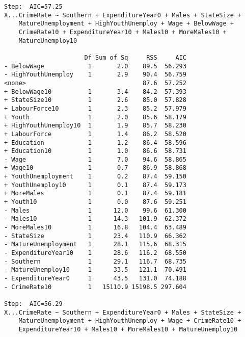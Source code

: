 \documentclass[11pt]{article}
\begin{document}
\begin{enumerate}
\begin{verbatim}
Step:  AIC=57.25
X...CrimeRate ~ Southern + ExpenditureYear0 + Males + StateSize + 
    MatureUnemployment + HighYouthUnemploy + Wage + BelowWage + 
    CrimeRate10 + ExpenditureYear10 + Males10 + MoreMales10 + 
    MatureUnemploy10

                      Df Sum of Sq     RSS     AIC
- BelowWage            1       2.0    89.5  56.293
- HighYouthUnemploy    1       2.9    90.4  56.759
<none>                                87.6  57.252
+ BelowWage10          1       3.4    84.2  57.393
+ StateSize10          1       2.6    85.0  57.828
+ LabourForce10        1       2.3    85.2  57.979
+ Youth                1       2.0    85.6  58.179
+ HighYouthUnemploy10  1       1.9    85.7  58.230
+ LabourForce          1       1.4    86.2  58.520
+ Education            1       1.2    86.4  58.596
+ Education10          1       1.0    86.6  58.731
- Wage                 1       7.0    94.6  58.865
+ Wage10               1       0.7    86.9  58.868
+ YouthUnemployment    1       0.2    87.4  59.150
+ YouthUnemploy10      1       0.1    87.4  59.173
+ MoreMales            1       0.1    87.4  59.181
+ Youth10              1       0.0    87.6  59.251
- Males                1      12.0    99.6  61.300
- Males10              1      14.3   101.9  62.372
- MoreMales10          1      16.8   104.4  63.489
- StateSize            1      23.4   110.9  66.362
- MatureUnemployment   1      28.1   115.6  68.315
- ExpenditureYear10    1      28.6   116.2  68.550
- Southern             1      29.1   116.7  68.735
- MatureUnemploy10     1      33.5   121.1  70.491
- ExpenditureYear0     1      43.5   131.0  74.188
- CrimeRate10          1   15110.9 15198.5 297.604

Step:  AIC=56.29
X...CrimeRate ~ Southern + ExpenditureYear0 + Males + StateSize + 
    MatureUnemployment + HighYouthUnemploy + Wage + CrimeRate10 + 
    ExpenditureYear10 + Males10 + MoreMales10 + MatureUnemploy10


\end{verbatim}
\end{enumerate}
\end{document}
